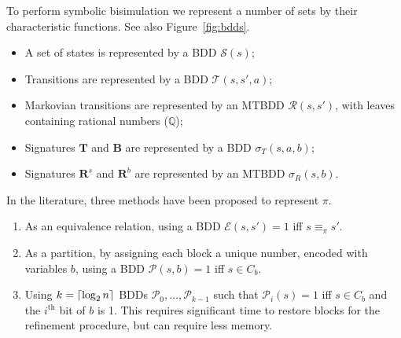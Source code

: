 To perform symbolic bisimulation we represent a number of sets by their characteristic functions. See also Figure~\ref{fig:bdds}.
\begin{itemize}
\item A set of states is represented by a BDD $\mathcal{S}(s)$;
\item Transitions are represented by a BDD $\mathcal{T}(s,s',a)$;
\item Markovian transitions are represented by an MTBDD $\mathcal{R}(s,s')$, with leaves containing rational numbers ($\mathbb{Q}$);
\item Signatures $\textbf{T}$ and $\textbf{B}$ are represented by a BDD $\sigma_T(s,a,b)$;
\item Signatures $\textbf{R}^s$ and $\textbf{R}^b$ are represented by an MTBDD $\sigma_R(s,b)$.
\end{itemize}




In the literature,
three methods have been proposed to represent $\pi$.
%
%
%
\begin{enumerate}
\item As an equivalence relation, using a BDD $\mathcal{E}(s,s')=1$ iff $s\equiv_{\pi} s'$.
\item As a partition, by assigning each block a unique number, encoded with variables $b$, using a BDD $\mathcal{P}(s,b)=1$ iff $s\in C_b$.
\item Using $k=\lceil\log_2 n\rceil$ BDDs $\mathcal{P}_{0},\dotsc,\mathcal{P}_{k-1}$ such that $\mathcal{P}_i(s)=1$ iff $s\in C_b$ and the $i^\text{th}$ bit of $b$ is 1. This requires significant time to restore blocks for the refinement procedure, but can require less memory.
\end{enumerate}



